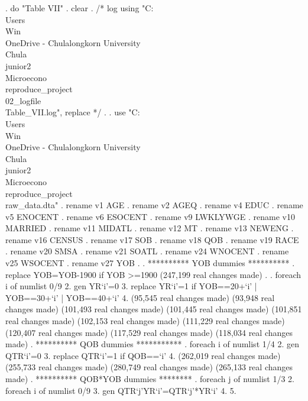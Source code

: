 . do "Table VII"
{\smallskip}
. clear
{\smallskip}
. /* log using "C:\\Users\\Win\\OneDrive - Chulalongkorn University\\Chula\\junior2\\Microecono\\reproduce_project\\02_logfile\\Table_VII.log", replace  */
. 
. use "C:\\Users\\Win\\OneDrive - Chulalongkorn University\\Chula\\junior2\\Microecono\\reproduce_project\\raw_data.dta"
{\smallskip}
. rename v1 AGE
{\smallskip}
. rename v2 AGEQ
{\smallskip}
. rename v4 EDUC
{\smallskip}
. rename v5 ENOCENT
{\smallskip}
. rename v6 ESOCENT
{\smallskip}
. rename v9 LWKLYWGE
{\smallskip}
. rename v10 MARRIED
{\smallskip}
. rename v11 MIDATL
{\smallskip}
. rename v12 MT
{\smallskip}
. rename v13 NEWENG
{\smallskip}
. rename v16 CENSUS
{\smallskip}
. rename v17 SOB
{\smallskip}
. rename v18 QOB
{\smallskip}
. rename v19 RACE
{\smallskip}
. rename v20 SMSA
{\smallskip}
. rename v21 SOATL
{\smallskip}
. rename v24 WNOCENT
{\smallskip}
. rename v25 WSOCENT
{\smallskip}
. rename v27 YOB
{\smallskip}
. 
. **********  YOB dummies **********
. replace YOB=YOB-1900 if YOB >=1900
(247,199 real changes made)
{\smallskip}
. 
. foreach i of numlist 0/9 {\lbr}
  2. gen YR`i'=0
  3. replace YR`i'=1 if YOB==20+`i' | YOB==30+`i' | YOB==40+`i' 
  4. {\rbr}
(95,545 real changes made)
(93,948 real changes made)
(101,493 real changes made)
(101,445 real changes made)
(101,851 real changes made)
(102,153 real changes made)
(111,229 real changes made)
(120,407 real changes made)
(117,529 real changes made)
(118,034 real changes made)
{\smallskip}
. **********  QOB dummies ***********
. foreach i of numlist 1/4 {\lbr}
  2. gen QTR`i'=0
  3. replace QTR`i'=1 if QOB==`i'
  4. {\rbr}
(262,019 real changes made)
(255,733 real changes made)
(280,749 real changes made)
(265,133 real changes made)
{\smallskip}
. **********  QOB*YOB dummies ********
. foreach j of numlist 1/3 {\lbr}
  2. foreach i of numlist 0/9 {\lbr}
  3. gen QTR`j'YR`i'=QTR`j'*YR`i'
  4. {\rbr}
  5. {\rbr}
{\smallskip}
